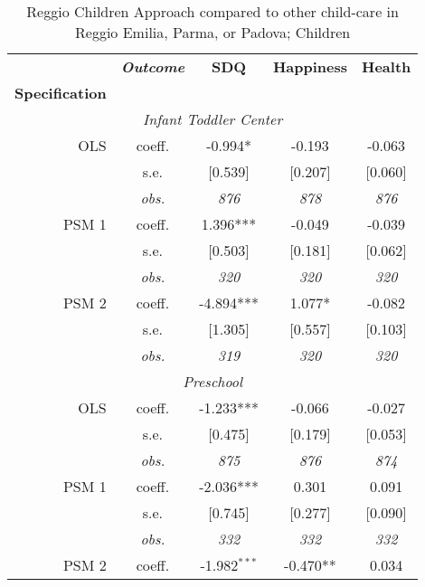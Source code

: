 \begin{table}[H] 
\caption{Reggio Children Approach compared to other child-care in Reggio Emilia, Parma, or Padova; Children}
\label{tab:resultsChildren-all}
 \begin{centering} 
\vspace{1ex}
\begin{tabular}{ r c ccc} 
\hline \hline 
 & \textbf{\textit{Outcome}} & \textbf{SDQ}  & \textbf{Happiness} & \textbf{Health}  \\ 
\textbf{Specification}  &  &  &  &  \\ 
\hline 
\multicolumn{5}{c}{\textit{Infant Toddler Center }} \\ 
\hline 

OLS	 & coeff.	 & -0.994*	 & -0.193	 & -0.063	\\
	 & s.e.	 & [0.539]	 & [0.207]	 & [0.060]	\\
	 & \textit{obs.}	 & \textit{876}	 & \textit{878}	 & \textit{876}	\\
PSM 1	 & coeff.	 & 1.396*** & -0.049	 & -0.039	\\
	 & s.e.	 & [0.503]	 & [0.181]	 & [0.062]	\\
	 & \textit{obs.}	 & \textit{320}	 & \textit{320}	 & \textit{320}	\\
PSM 2	 & coeff.	 & -4.894***	 & 1.077*	 & -0.082	\\
	 & s.e.	 & [1.305]	 & [0.557]	 & [0.103]	\\
	 & \textit{obs.}	 & \textit{319}	 & \textit{320}	 & \textit{320}	\\
\hline \multicolumn{5}{c}{\textit{Preschool }} \\ \hline
OLS	 & coeff.	 & -1.233*** & -0.066 & -0.027	\\
	 & s.e.	 & [0.475]	 & [0.179]	 & [0.053]	\\
	 & \textit{obs.}	 & \textit{875}	 & \textit{876}	 & \textit{874}	\\
PSM 1	 & coeff.	 & -2.036***	 & 0.301	 & 0.091\\
	 & s.e.	 & [0.745]	 & [0.277]	 & [0.090]	\\
	 & \textit{obs.}	 & \textit{332}	 & \textit{332}	 & \textit{332}	\\
PSM 2	 & coeff.	 & -1.982$^{***}$	 & -0.470**	 & 0.034	\\

\end{tabular}
\end{centering}
\end{table}
